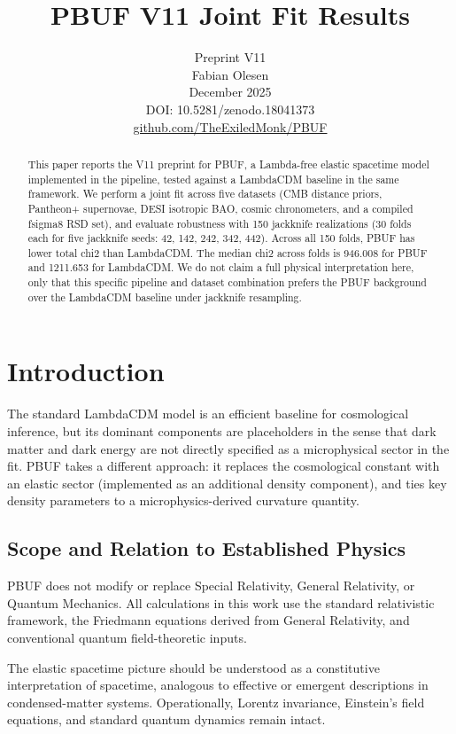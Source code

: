 \documentclass[11pt]{article}
\title{PBUF V11 Joint Fit Results}
\author{Preprint V11\\Fabian Olesen\\December 2025\\DOI: 10.5281/zenodo.18041373\\\href{https://github.com/TheExiledMonk/PBUF}{github.com/TheExiledMonk/PBUF}}
\date{}
\begin{document}
\maketitle

\begin{abstract}
This paper reports the V11 preprint for PBUF, a Lambda-free elastic spacetime model implemented in the pipeline, tested against a LambdaCDM baseline in the same framework.
We perform a joint fit across five datasets (CMB distance priors, Pantheon+ supernovae, DESI isotropic BAO, cosmic chronometers, and a compiled fsigma8 RSD set), and evaluate robustness with 150 jackknife realizations (30 folds each for five jackknife seeds: 42, 142, 242, 342, 442).
Across all 150 folds, PBUF has lower total chi2 than LambdaCDM.
The median chi2 across folds is 946.008 for PBUF and 1211.653 for LambdaCDM.
We do not claim a full physical interpretation here, only that this specific pipeline and dataset combination prefers the PBUF background over the LambdaCDM baseline under jackknife resampling.
\end{abstract}

\section{Introduction}
The standard LambdaCDM model is an efficient baseline for cosmological inference, but its dominant components are placeholders in the sense that dark matter and dark energy are not directly specified as a microphysical sector in the fit.
PBUF takes a different approach: it replaces the cosmological constant with an elastic sector (implemented as an additional density component), and ties key density parameters to a microphysics-derived curvature quantity.

\subsection{Scope and Relation to Established Physics}

PBUF does not modify or replace Special Relativity, General Relativity, or Quantum Mechanics.
All calculations in this work use the standard relativistic framework, the Friedmann equations derived from General Relativity, and conventional quantum field-theoretic inputs.

The elastic spacetime picture should be understood as a constitutive interpretation of spacetime, analogous to effective or emergent descriptions in condensed-matter systems.
Operationally, Lorentz invariance, Einstein’s field equations, and standard quantum dynamics remain intact.
\end{document}
